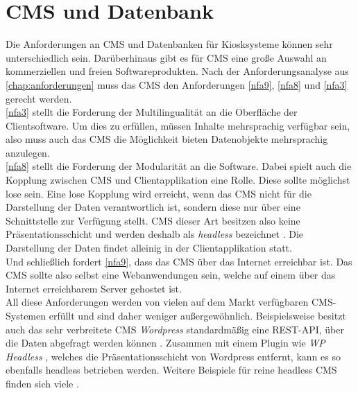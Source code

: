 \section{CMS und Datenbank}
\label{sec:backend}

Die Anforderungen an CMS und Datenbanken für Kiosksysteme können sehr unterschiedlich sein. 
Darüberhinaus gibt es für CMS eine große Auswahl an kommerziellen und freien Softwareprodukten.
Nach der Anforderungsanalyse aus \autoref{chap:anforderungen} muss das CMS den Anforderungen
\ref{nfa9}, \ref{nfa8} und \ref{nfa3} gerecht werden.\\

\ref{nfa3} stellt die Forderung der Multilingualität an die Oberfläche der Clientsoftware. 
Um dies zu erfüllen, müssen Inhalte mehrsprachig verfügbar sein, also muss auch 
das CMS die Möglichkeit bieten Datenobjekte mehrsprachig anzulegen.\\
\ref{nfa8} stellt die Forderung der Modularität an die Software. 
Dabei spielt auch die Kopplung zwischen CMS und 
Clientapplikation eine Rolle. Diese sollte möglichst lose sein. Eine lose Kopplung
wird erreicht, wenn das CMS nicht für die Darstellung der Daten verantwortlich ist, sondern 
diese nur über eine Schnittstelle zur Verfügung stellt. CMS dieser Art besitzen also 
keine Präsentationsschicht und werden deshalb als \emph{headless} bezeichnet \cite{headless-market}.
Die Darstellung der Daten findet alleinig in der Clientapplikation statt.\\
Und schließlich fordert \ref{nfa9}, dass das CMS über das Internet erreichbar ist. 
Das CMS sollte also selbst eine Webanwendungen sein, welche auf einem über das Internet erreichbarem Server
gehostet ist.\\

All diese Anforderungen werden von vielen auf dem Markt verfügbaren CMS-Systemen erfüllt
und sind daher weniger außergewöhnlich. Beispielsweise besitzt auch das sehr verbreitete CMS \emph{Wordpress} 
standardmäßig eine REST-API, über die Daten abgefragt werden können \cite{wordpress}. Zusammen mit einem 
Plugin wie \emph{WP Headless} \cite{wordpress-headless}, welches die Präsentationsschicht von Wordpress
entfernt, kann es so ebenfalls headless betrieben werden. Weitere Beispiele für reine headless CMS finden sich
viele \cite{headless-marktuebersicht}.\\

